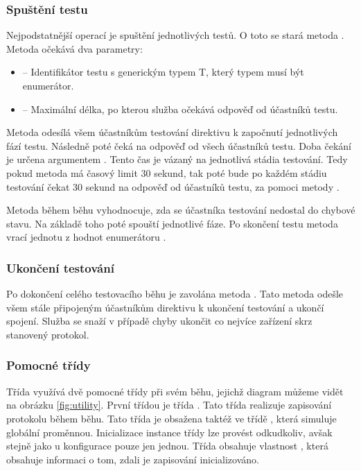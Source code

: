 \subsubsection{Spuštění testu}

Nejpodstatnější operací je spuštění jednotlivých testů. O toto se stará metoda . Metoda očekává dva parametry:

\begin{itemize}
    \item {} -- Identifikátor testu s generickým typem T, který typem musí být enumerátor.
    \item {} -- Maximální délka, po kterou služba očekává odpověď od účastníků testu. 
\end{itemize}

Metoda odesílá všem účastníkům testování direktivu k započnutí jednotlivých fází testu. Následně poté čeká na odpověď od všech účastníků testu. Doba čekání je určena argumentem . Tento čas je vázaný na jednotlivá stádia testování. Tedy pokud metoda má časový limit 30 sekund, tak poté bude po každém stádiu testování čekat 30 sekund na odpověď od účastníků testu, za pomoci metody .

Metoda během běhu vyhodnocuje, zda se účastníka testování nedostal do chybové stavu. Na základě toho poté spouští jednotlivé fáze. Po skončení testu metoda vrací jednotu z hodnot enumerátoru . 

\subsubsection{Ukončení testování}

Po dokončení celého testovacího běhu je zavolána metoda . Tato metoda odešle všem stále připojeným účastníkům direktivu k ukončení testování a ukončí spojení. Služba se snaží v případě chyby ukončit co nejvíce zařízení skrz stanovený protokol.

\subsubsection{Pomocné třídy}
Třída  využívá dvě pomocné třídy při svém běhu, jejichž diagram můžeme vidět na obrázku \ref{fig:utility}. První třídou je třída . Tato třída realizuje zapisování protokolu během běhu. Tato třída je obsažena taktéž ve třídě , která simuluje globální proměnnou. Inicializace instance třídy  lze provést odkudkoliv, avšak stejně jako u konfigurace pouze jen jednou. Třída  obsahuje vlastnost , která obsahuje informaci o tom, zdali je zapisování inicializováno. 

